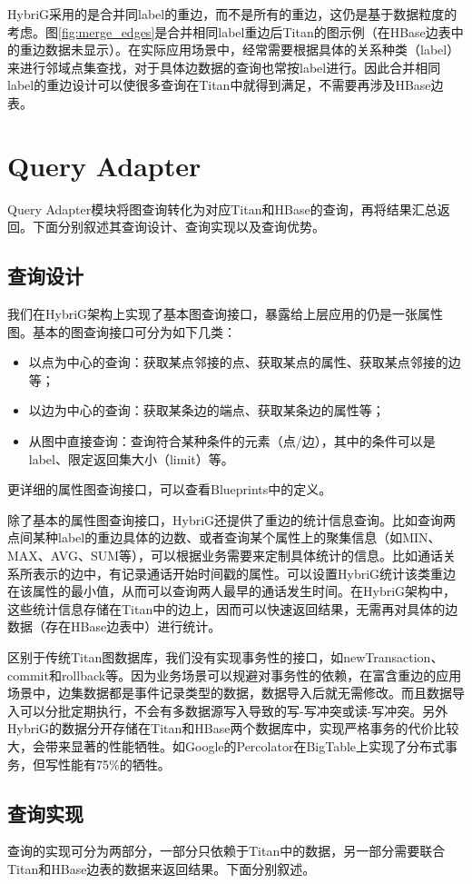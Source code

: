 HybriG采用的是合并同label的重边，而不是所有的重边，这仍是基于数据粒度的考虑。图\ref{fig:merge_edges}是合并相同label重边后Titan的图示例（在HBase边表中的重边数据未显示）。在实际应用场景中，经常需要根据具体的关系种类（label）来进行邻域点集查找，对于具体边数据的查询也常按label进行。因此合并相同label的重边设计可以使很多查询在Titan中就得到满足，不需要再涉及HBase边表。


\section{Query Adapter}
Query Adapter模块将图查询转化为对应Titan和HBase的查询，再将结果汇总返回。下面分别叙述其查询设计、查询实现以及查询优势。
\subsection{查询设计}
我们在HybriG架构上实现了基本图查询接口，暴露给上层应用的仍是一张属性图。基本的图查询接口可分为如下几类：
\begin{itemize}
	\item 以点为中心的查询：获取某点邻接的点、获取某点的属性、获取某点邻接的边等；
	\item 以边为中心的查询：获取某条边的端点、获取某条边的属性等；
	\item 从图中直接查询：查询符合某种条件的元素（点/边），其中的条件可以是label、限定返回集大小（limit）等。
\end{itemize}
更详细的属性图查询接口，可以查看Blueprints中的定义。

除了基本的属性图查询接口，HybriG还提供了重边的统计信息查询。比如查询两点间某种label的重边具体的边数、或者查询某个属性上的聚集信息（如MIN、MAX、AVG、SUM等），可以根据业务需要来定制具体统计的信息。比如通话关系所表示的边中，有记录通话开始时间戳的属性。可以设置HybriG统计该类重边在该属性的最小值，从而可以查询两人最早的通话发生时间。在HybriG架构中，这些统计信息存储在Titan中的边上，因而可以快速返回结果，无需再对具体的边数据（存在HBase边表中）进行统计。

区别于传统Titan图数据库，我们没有实现事务性的接口，如newTransaction、commit和rollback等。因为业务场景可以规避对事务性的依赖，在富含重边的应用场景中，边集数据都是事件记录类型的数据，数据导入后就无需修改。而且数据导入可以分批定期执行，不会有多数据源写入导致的写-写冲突或读-写冲突。另外HybriG的数据分开存储在Titan和HBase两个数据库中，实现严格事务的代价比较大，会带来显著的性能牺牲。如Google的Percolator\supercite{percolator}在BigTable上实现了分布式事务，但写性能有75\%的牺牲。

\subsection{查询实现}
查询的实现可分为两部分，一部分只依赖于Titan中的数据，另一部分需要联合Titan和HBase边表的数据来返回结果。下面分别叙述。

